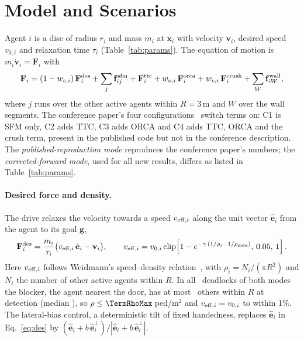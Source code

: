 \section{Model and Scenarios}\label{sec:model}

%
Agent $i$ is a disc of radius $r_i$ and mass $m_i$ at $\mathbf{x}_i$ with velocity $\mathbf{v}_i$, desired speed $v_{0,i}$ and relaxation time $\tau_i$ (Table~\ref{tab:params}). The equation of motion is $m_i\dot{\mathbf{v}}_i=\mathbf{F}_i$ with
\begin{equation}\label{eq:force}
\mathbf{F}_i=(1-w_{c,i})\,\mathbf{F}^{\rm des}_i+\sum_{j}\mathbf{f}^{\rm sfm}_{ij}+\mathbf{F}^{\rm ttc}_i+w_{o,i}\,\mathbf{F}^{\rm orca}_i+w_{c,i}\,\mathbf{F}^{\rm crush}_i+\sum_{W}\mathbf{f}^{\rm wall}_{iW},
\end{equation}
where $j$ runs over the other active agents within $R=3$\,m and $W$ over the wall segments. The conference paper's four configurations~\cite{gang2026} switch terms on: C1 is SFM only, C2 adds TTC, C3 adds ORCA and C4 adds TTC, ORCA and the crush term, present in the published code but not in the conference description. The \emph{published-reproduction mode} reproduces the conference paper's numbers; the \emph{corrected-forward mode}, used for all new results, differs as listed in Table~\ref{tab:params}.

\paragraph{Desired force and density.}
The drive relaxes the velocity towards a speed $v_{{\rm eff},i}$ along the unit vector $\hat{\mathbf e}_i$ from the agent to its goal $\mathbf g$,
\begin{equation}\label{eq:des}
\mathbf{F}^{\rm des}_i=\frac{m_i}{\tau_i}\bigl(v_{{\rm eff},i}\,\hat{\mathbf e}_i-\mathbf v_i\bigr),\qquad
v_{{\rm eff},i}=v_{0,i}\,\mathrm{clip}\!\left[1-e^{-\gamma\,(1/\rho_i-1/\rho_{\max})},\,0.05,\,1\right].
\end{equation}
Here $v_{{\rm eff},i}$ follows Weidmann's speed--density relation~\cite{weidmann1993}, with $\rho_i=N_i/(\pi R^2)$ and $N_i$ the number of other active agents within $R$. In all \TermN\ deadlocks of both modes the blocker, the agent nearest the door, has at most \TermNbMax\ others within $R$ at detection (median \TermNbMedian), so $\rho\le\TermRhoMax$\,ped/m$^2$ and $v_{{\rm eff},i}=v_{0,i}$ to within 1\%. The lateral-bias control, a deterministic tilt of fixed handedness, replaces $\hat{\mathbf e}_i$ in Eq.~\eqref{eq:des} by $(\hat{\mathbf e}_i+b\,\hat{\mathbf e}^{\perp}_i)/|\hat{\mathbf e}_i+b\,\hat{\mathbf e}^{\perp}_i|$.

